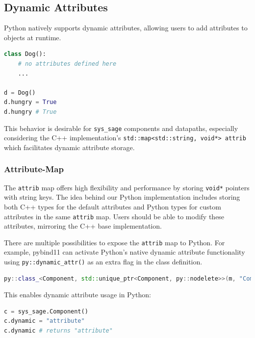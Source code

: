 \subsection{Dynamic Attributes}

Python natively supports dynamic attributes, allowing users to add attributes to objects at runtime.

\begin{lstlisting}[language=Python, xleftmargin=4em, frame = single]
class Dog():
    # no attributes defined here
    ...

d = Dog()
d.hungry = True
d.hungry # True
\end{lstlisting}

This behavior is desirable for \verb|sys_sage| components and datapaths, especially considering the C++ implementation's \verb|std::map<std::string, void*> attrib| which facilitates dynamic attribute storage.

\subsubsection{Attribute-Map}

The \verb|attrib| map offers high flexibility and performance by storing \verb|void*| pointers with string keys. The idea behind our Python implementation includes storing both C++ types for the default attributes and Python types for custom attributes in the same \verb|attrib| map. Users should be able to modify these attributes, mirroring the C++ base implementation.

There are multiple possibilities to expose the \verb|attrib| map to Python. For example, pybind11 can activate Python's native dynamic attribute functionality using \verb|py::dynamic_attr()| as an extra flag in the class definition. \cite[see The Basics/Object-Oriented Code]{pybind11-docu}

\begin{lstlisting}[language=C++, xleftmargin=4em, frame = single]
py::class_<Component, std::unique_ptr<Component, py::nodelete>>(m, "Component", py::dynamic_attr(),"Generic Component");
\end{lstlisting}

This enables dynamic attribute usage in Python:

\begin{lstlisting}[language=Python, xleftmargin=4em, frame = single]
c = sys_sage.Component()
c.dynamic = "attribute"
c.dynamic # returns "attribute"
\end{lstlisting}

